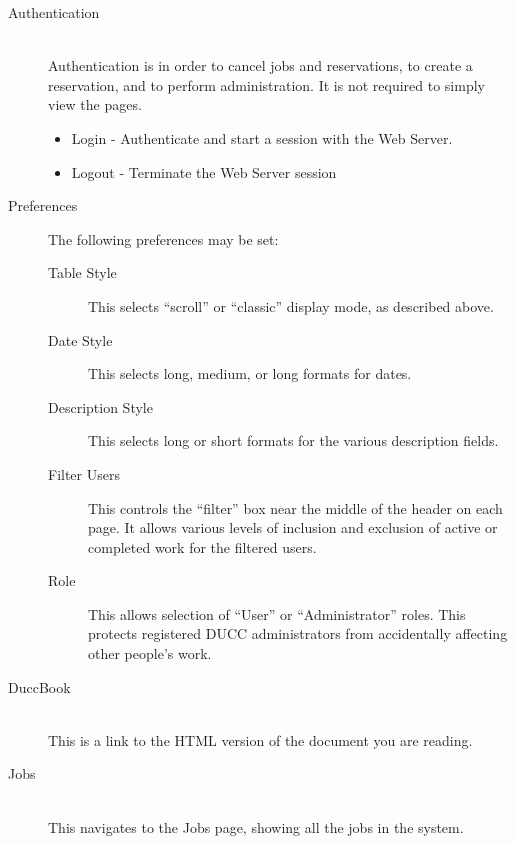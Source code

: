         \begin{description}
          \item[Authentication] \hfill \\ 
            Authentication is in order to cancel jobs and reservations, to create a
            reservation, and to perform administration. It is not required to simply view the pages.

            \begin{itemize}
              \item Login - Authenticate and start a session with the Web Server.             
              \item Logout - Terminate the Web Server session 
            \end{itemize}

          \item[Preferences]
            The following preferences may be set:
            \begin{description}
              \item[Table Style] This selects ``scroll'' or ``classic'' display mode, as
                described above.
              \item[Date Style] This selects long, medium, or long formats for dates.
              \item[Description Style] This selects long or short formats for the various
                description fields.
              \item[Filter Users] This controls the ``filter'' box near the middle of
                the header on each page.  It allows various levels of inclusion and
                exclusion of active or completed work for the filtered users.
              \item[Role] This allows selection of ``User'' or ``Administrator'' roles.
                This protects registered DUCC administrators from accidentally affecting
                other people's work.
            \end{description}
            
          \item[DuccBook] \hfill \\
            This is a link to the HTML version of the document you are reading.

          \item[Jobs] \hfill \\
            This navigates to the Jobs page, showing all the jobs in the system.


\end{description}
